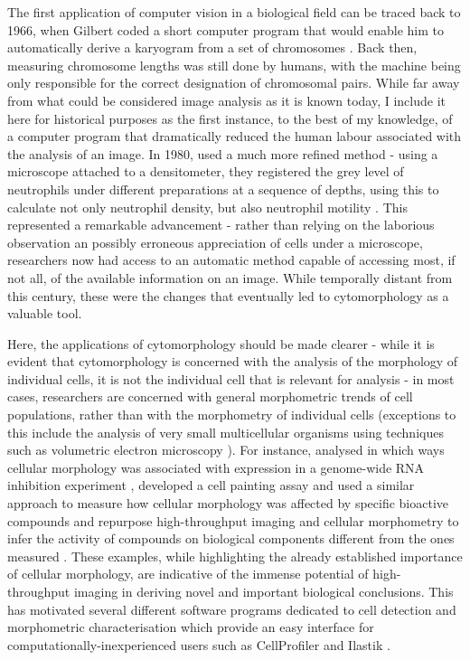 The first application of computer vision in a biological field can be traced back to 1966, when Gilbert coded a short computer program that would enable him to automatically derive a karyogram from a set of chromosomes \cite{Gilbert1966-km}. Back then, measuring chromosome lengths was still done by humans, with the machine being only responsible for the correct designation of chromosomal pairs. While far away from what could be considered image analysis as it is known today, I include it here for historical purposes as the first instance, to the best of my knowledge, of a computer program that dramatically reduced the human labour associated with the analysis of an image. In 1980,  used a much more refined method - using a microscope attached to a densitometer, they registered the grey level of neutrophils under different preparations at a sequence of depths, using this to calculate not only neutrophil density, but also neutrophil motility \cite{Howe1980-ua}. This represented a remarkable advancement - rather than relying on the laborious observation an possibly erroneous appreciation of cells under a microscope, researchers now had access to an automatic method capable of accessing most, if not all, of the available information on an image. While temporally distant from this century, these were the changes that eventually led to cytomorphology as a valuable tool. 

Here, the applications of cytomorphology should be made clearer - while it is evident that cytomorphology is concerned with the analysis of the morphology of individual cells, it is not the individual cell that is relevant for analysis - in most cases, researchers are concerned with general morphometric trends of cell populations, rather than with the morphometry of individual cells (exceptions to this include the analysis of very small multicellular organisms using techniques such as volumetric electron microscopy \cite{Vergara2021-nx,Witvliet2021-gv}). For instance,  analysed in which ways cellular morphology was associated with expression in a genome-wide RNA inhibition experiment \cite{Fuchs2010-pk},  developed a cell painting assay and used a similar approach to measure how cellular morphology was affected by specific bioactive compounds \cite{Gustafsdottir2013-ul} and  repurpose high-throughput imaging and cellular morphometry to infer the activity of compounds on biological components different from the ones measured \cite{Simm2018-nh}. These examples, while highlighting the already established importance of cellular morphology, are indicative of the immense potential of high-throughput imaging in deriving novel and important biological conclusions. This has motivated several different software programs dedicated to cell detection and morphometric characterisation which provide an easy interface for computationally-inexperienced users such as CellProfiler \cite{Carpenter2006-hy} and Ilastik \cite{Sommer2011-ds}.

